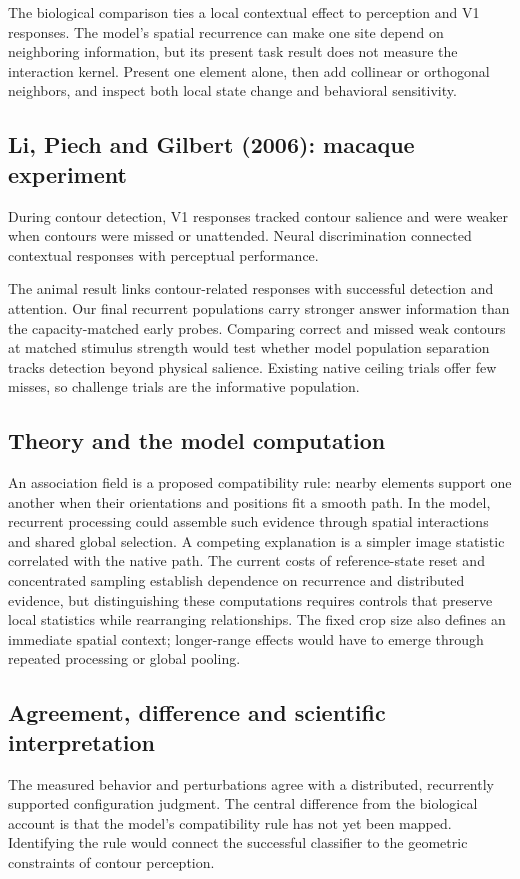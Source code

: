 \documentclass[11pt]{article}
\begin{document}
The biological comparison ties a local contextual effect to perception and V1 responses. The model’s spatial recurrence can make one site depend on neighboring information, but its present task result does not measure the interaction kernel. Present one element alone, then add collinear or orthogonal neighbors, and inspect both local state change and behavioral sensitivity.

\subsection{Li, Piech and Gilbert (2006): macaque experiment}
During contour detection, V1 responses tracked contour salience and were weaker when contours were missed or unattended. Neural discrimination connected contextual responses with perceptual performance. \cite{bio_li}

The animal result links contour-related responses with successful detection and attention. Our final recurrent populations carry stronger answer information than the capacity-matched early probes. Comparing correct and missed weak contours at matched stimulus strength would test whether model population separation tracks detection beyond physical salience. Existing native ceiling trials offer few misses, so challenge trials are the informative population.

\subsection{Theory and the model computation}
An association field is a proposed compatibility rule: nearby elements support one another when their orientations and positions fit a smooth path. In the model, recurrent processing could assemble such evidence through spatial interactions and shared global selection. A competing explanation is a simpler image statistic correlated with the native path. The current costs of reference-state reset and concentrated sampling establish dependence on recurrence and distributed evidence, but distinguishing these computations requires controls that preserve local statistics while rearranging relationships. The fixed crop size also defines an immediate spatial context; longer-range effects would have to emerge through repeated processing or global pooling.

\subsection{Agreement, difference and scientific interpretation}
The measured behavior and perturbations agree with a distributed, recurrently supported configuration judgment. The central difference from the biological account is that the model’s compatibility rule has not yet been mapped. Identifying the rule would connect the successful classifier to the geometric constraints of contour perception.
\end{document}
